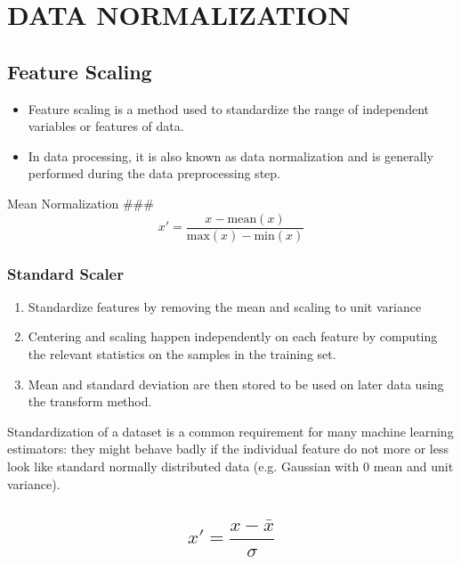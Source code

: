 \documentclass[11pt]{article}
\providecommand{\tightlist}{%
      \setlength{\itemsep}{0pt}\setlength{\parskip}{0pt}}
\begin{document}
    \section{DATA NORMALIZATION}\label{data-normalization}

    \subsection{Feature Scaling}\label{feature-scaling}

\begin{itemize}
\tightlist
\item
  Feature scaling is a method used to standardize the range of
  independent variables or features of data.
\item
  In data processing, it is also known as data normalization and is
  generally performed during the data preprocessing step.
\end{itemize}

Mean Normalization \#\#\#
\[x' = \frac{x - \text{mean}(x)}{\text{max}(x)-\text{min}(x)}\]

    \subsubsection{Standard Scaler}\label{standard-scaler}

\begin{enumerate}
\def\labelenumi{\arabic{enumi}.}
\item
  Standardize features by removing the mean and scaling to unit variance
\item
  Centering and scaling happen independently on each feature by
  computing the relevant statistics on the samples in the training set.
\item
  Mean and standard deviation are then stored to be used on later data
  using the transform method.
\end{enumerate}

Standardization of a dataset is a common requirement for many machine
learning estimators: they might behave badly if the individual feature
do not more or less look like standard normally distributed data (e.g.
Gaussian with 0 mean and unit variance).

\subsection{\texorpdfstring{\[x' = \frac{x - \bar{x}}{\sigma}\]}{x' = \textbackslash{}frac\{x - \textbackslash{}bar\{x\}\}\{\textbackslash{}sigma\}}}\label{x-fracx---barxsigma}
\end{document}
